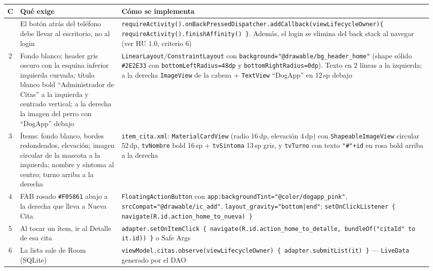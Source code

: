 \documentclass[11pt,letterpaper]{article}
\newcommand{\hex}[1]{\texttt{\##1}}
\newcommand{\code}[1]{\texttt{\small #1}}
\begin{document}
\begin{center}
\footnotesize
\begin{xltabular}{\linewidth}{@{}c X X@{}}
\toprule
\textbf{C} & \textbf{Qu\'e exige} & \textbf{C\'omo se implementa}\\
\midrule
\endhead
\bottomrule
{} & El bot\'on atr\'as del tel\'efono debe llevar al escritorio, no al login &
\code{requireActivity(\allowbreak{}).onBackPressedDispatcher.\allowbreak{}addCallback(\allowbreak{}viewLifecycleOwner)\{ requireActivity(\allowbreak{}).finishAffinity(\allowbreak{}) \}}. Adem\'as, el login se elimina del back stack al navegar (ver HU 1.0, criterio 6)\\
2 & Fondo blanco; header gris oscuro con la esquina inferior izquierda curvada; t\'itulo blanco bold ``Administrador de Citas'' a la izquierda y centrado vertical; a la derecha la imagen del perro con ``DogApp'' debajo & \code{LinearLayout}/\code{ConstraintLayout} con \code{background=\allowbreak{}"@drawable/\allowbreak{}bg\_header\_home"} (shape s\'olido \hex{2E2E33} con \code{bottomLeftRadius=\allowbreak{}48dp} y \code{bottomRightRadius=\allowbreak{}0dp}). Texto en 2 l\'ineas a la izquierda; a la derecha \code{ImageView} de la cabeza + \code{TextView} ``DogApp'' en 12\,sp debajo\\
3 & \'Items: fondo blanco, bordes redondeados, elevaci\'on; imagen circular de la mascota a la izquierda; nombre y s\'intoma al centro; turno arriba a la derecha & \code{item\_cita.\allowbreak{}xml}: \code{MaterialCardView} (radio 16\,dp, elevaci\'on 4\,dp) con \code{ShapeableImageView} circular 52\,dp, \code{tvNombre} bold 16\,sp + \code{tvSintoma} 13\,sp gris, y \code{tvTurno} con texto \code{"\#"+id} en rosa bold arriba a la derecha\\
4 & FAB rosado \hex{F05861} abajo a la derecha que lleva a Nueva Cita & \code{FloatingActionButton} con \code{app:backgroundTint=\allowbreak{}"@color/\allowbreak{}dogapp\_pink"}, \code{srcCompat=\allowbreak{}"@drawable/\allowbreak{}ic\_add"}, \code{layout\_gravity=\allowbreak{}"bottom|end"}; \code{setOnClickListener \{ navigate(\allowbreak{}R.id.action\_home\_to\_nueva) \}}\\
5 & Al tocar un \'item, ir al Detalle de esa cita & \code{adapter.\allowbreak{}setOnItemClick \{ navigate(\allowbreak{}R.id.action\_home\_to\_detalle,\allowbreak{} bundleOf(\allowbreak{}"citaId" to it.\allowbreak{}id)) \}} o Safe Args\\
6 & La lista sale de Room (SQLite) & \code{viewModel.\allowbreak{}citas.observe(\allowbreak{}viewLifecycleOwner) \{ adapter.\allowbreak{}submitList(\allowbreak{}it) \}} --- \code{LiveData} generado por el DAO\\
\end{xltabular}
\end{center}
\end{document}
